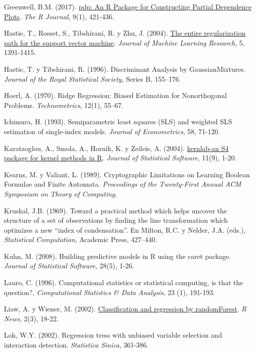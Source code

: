 \documentclass[
]{book}
\theoremstyle{break}
\theoremstyle{definition}
\theoremstyle{definition}
\theoremstyle{definition}
\theoremstyle{remark}
\begin{document}
Greenwell, B.M. (2017). \href{https://journal.r-project.org/archive/2017/RJ-2017-016/index.html}{pdp: An R Package for Constructing Partial Dependence Plots}. \emph{The R Journal}, 9(1), 421-436.

Hastie, T., Rosset, S., Tibshirani, R. y Zhu, J. (2004). \href{https://www.jmlr.org/papers/v5/hastie04a.html}{The entire regularization path for the support vector machine}. \emph{Journal of Machine Learning Research}, 5, 1391-1415.

Hastie, T. y Tibshirani, R. (1996). Discriminant Analysis by GaussianMixtures. \emph{Journal of the Royal Statistical Society}, Series B, 155--176.

Hoerl, A. (1970). Ridge Regression: Biased Estimation for Nonorthogonal Problems. \emph{Technometrics}, 12(1), 55--67.

Ichimura, H. (1993). Semiparametric least squares (SLS) and weighted SLS estimation of single-index models. \emph{Journal of Econometrics}, 58, 71-120.

Karatzoglou, A., Smola, A., Hornik, K. y Zeileis, A. (2004). \href{http://www.jstatsoft.org/v11/i09}{kernlab-an S4 package for kernel methods in R}. \emph{Journal of Statistical Software}, 11(9), 1-20.

Kearns, M. y Valiant, L. (1989). Cryptographic Limitations on Learning Boolean Formulae and Finite Automata. \emph{Proceedings of the Twenty-First Annual ACM Symposium on Theory of Computing}.

Kruskal, J.B. (1969). Toward a practical method which helps uncover the structure of a set of observations by finding the line transformation which optimizes a new ``index of condensation''. En Milton, R.C. y Nelder, J.A. (eds.), \emph{Statistical Computation}, Academic Press, 427--440.

Kuhn, M. (2008). Building predictive models in R using the caret package. \emph{Journal of Statistical Software}, 28(5), 1-26.

Lauro, C. (1996). Computational statistics or statistical computing, is that the question?, \emph{Computational Statistics \& Data Analysis}, 23 (1), 191-193.

Liaw, A. y Wiener, M. (2002). \href{https://www.r-project.org/doc/Rnews/Rnews_2002-3.pdf}{Classification and regression by randomForest}. \emph{R News}, 2(3), 18-22.

Loh, W.Y. (2002). Regression tress with unbiased variable selection and interaction detection. \emph{Statistica Sinica}, 361-386.
\end{document}
